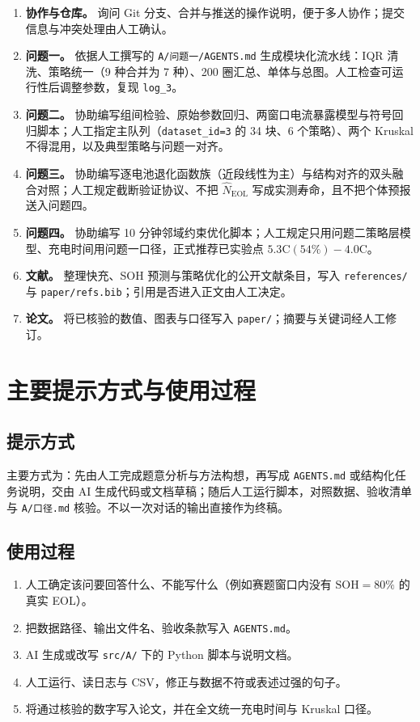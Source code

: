 \documentclass[a4paper,12pt,UTF8,zihao=-4]{ctexart}
\begin{document}
\begin{enumerate}
  \item \textbf{协作与仓库。} 询问 Git 分支、合并与推送的操作说明，便于多人协作；提交信息与冲突处理由人工确认。
  \item \textbf{问题一。} 依据人工撰写的 \texttt{A/问题一/AGENTS.md} 生成模块化流水线：IQR 清洗、策略统一（9 种合并为 7 种）、200 圈汇总、单体与总图。人工检查可运行性后调整参数，复现 \texttt{log\_3}。
  \item \textbf{问题二。} 协助编写组间检验、原始参数回归、两窗口电流暴露模型与符号回归脚本；人工指定主队列（\texttt{dataset\_id=3} 的 34 块、6 个策略）、两个 Kruskal 不得混用，以及典型策略与问题一对齐。
  \item \textbf{问题三。} 协助编写逐电池退化函数族（近段线性为主）与结构对齐的双头融合对照；人工规定截断验证协议、不把 \(\hat N_{\mathrm{EOL}}\) 写成实测寿命，且不把个体预报送入问题四。
  \item \textbf{问题四。} 协助编写 10 分钟邻域约束优化脚本；人工规定只用问题二策略层模型、充电时间用问题一口径，正式推荐已实验点 \(5.3\mathrm{C}(54\%)-4.0\mathrm{C}\)。
  \item \textbf{文献。} 整理快充、SOH 预测与策略优化的公开文献条目，写入 \texttt{references/} 与 \texttt{paper/refs.bib}；引用是否进入正文由人工决定。
  \item \textbf{论文。} 将已核验的数值、图表与口径写入 \texttt{paper/}；摘要与关键词经人工修订。
\end{enumerate}

\section{主要提示方式与使用过程}

\subsection{提示方式}

主要方式为：先由人工完成题意分析与方法构想，再写成 \texttt{AGENTS.md} 或结构化任务说明，交由 AI 生成代码或文档草稿；随后人工运行脚本，对照数据、验收清单与 \texttt{A/口径.md} 核验。不以一次对话的输出直接作为终稿。

\subsection{使用过程}

\begin{enumerate}
  \item 人工确定该问要回答什么、不能写什么（例如赛题窗口内没有 \(\mathrm{SOH}=80\%\) 的真实 EOL）。
  \item 把数据路径、输出文件名、验收条款写入 \texttt{AGENTS.md}。
  \item AI 生成或改写 \texttt{src/A/} 下的 Python 脚本与说明文档。
  \item 人工运行、读日志与 CSV，修正与数据不符或表述过强的句子。
  \item 将通过核验的数字写入论文，并在全文统一充电时间与 Kruskal 口径。
\end{enumerate}
\end{document}
